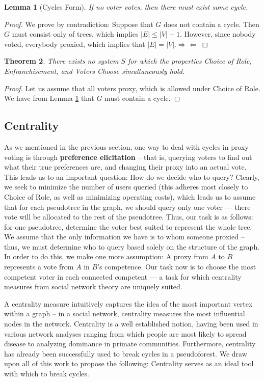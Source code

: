 \documentclass[10pt]{article}
\newtheorem{theorem}{Theorem}[section]
\newtheorem{lemma}[theorem]{Lemma}
\theoremstyle{definition}
\begin{document}
\begin{lemma}[Cycles Form]
\label{cyclesform}
If no voter votes, then there must exist some cycle.
\end{lemma}
\begin{proof}
We prove by contradiction:
Suppose that $G$ does not contain a cycle. Then $G$ must consist only of trees, which implies $|E| \leq |V| -1$. However, since nobody voted, everybody proxied, which implies that $|E| = |V|. \Rightarrow\Leftarrow$
\end{proof}

\begin{theorem} 
\label{CFLIT}
There exists no system $S$ for which the properties Choice of Role, Enfranchisement, and Voters Choose simultaneously hold.
\end{theorem}
\begin{proof}
Let us assume that all voters proxy, which is allowed under Choice of Role. We have from Lemma \ref{cyclesform} that $G$ must contain a cycle. 
\end{proof}

\subsection{Centrality}

As we mentioned in the previous section, one way to deal with cycles in proxy voting is through \textbf{preference elicitation} -- that is, querying voters to find out what their true preferences are, and changing their proxy into an actual vote. This leads us to an important question: How do we decide who to query? Clearly, we seek to minimize the number of users queried (this adheres most closely to Choice of Role, as well as minimizing operating costs), which leads us to assume that for each pseudotree in the graph, we should query only one voter --- there vote will be allocated to the rest of the pseudotree. Thus, our task is as follows: for one pseudotree, determine the voter best suited to represent the whole tree. We assume that the only information we have is to whom someone proxied -- thus, we must determine who to query based solely on the structure of the graph. In order to do this, we make one more assumption: A proxy from $A$ to $B$ represents a vote from $A$ in $B$'s competence. Our task now is to choose the most competent voter in each connected competent --- a task for which centrality measures from social network theory are uniquely suited.

A centrality measure intuitively captures the idea of the most important vertex within a graph -- in a social network, centrality measures the most influential nodes in the network.\cite{centrality}\cite{cwiki} Centrality is a well established notion, having been used in various network analyses ranging from which people are most likely to spread disease to analyzing dominance in primate communities. Furthermore, centrality has already been successfully used to break cycles in a pseudoforest.\cite{wikipedia} We draw upon all of this work to propose the following: Centrality serves as an ideal tool with which to break cycles. 
\end{document}
